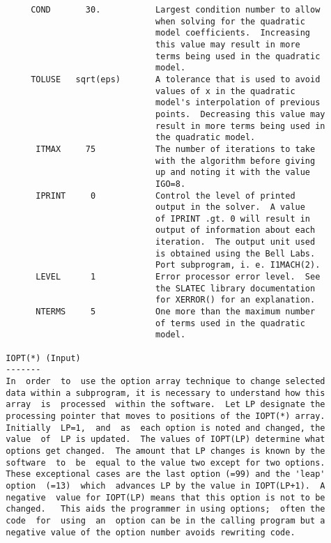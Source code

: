 \begin{verbatim}
       COND       30.           Largest condition number to allow
                                when solving for the quadratic
                                model coefficients.  Increasing
                                this value may result in more
                                terms being used in the quadratic
                                model.
       TOLUSE   sqrt(eps)       A tolerance that is used to avoid
                                values of x in the quadratic
                                model's interpolation of previous
                                points.  Decreasing this value may
                                result in more terms being used in
                                the quadratic model.
        ITMAX     75            The number of iterations to take
                                with the algorithm before giving
                                up and noting it with the value
                                IGO=8.
        IPRINT     0            Control the level of printed
                                output in the solver.  A value
                                of IPRINT .gt. 0 will result in
                                output of information about each
                                iteration.  The output unit used
                                is obtained using the Bell Labs.
                                Port subprogram, i. e. I1MACH(2).
        LEVEL      1            Error processor error level.  See
                                the SLATEC library documentation
                                for XERROR() for an explanation.
        NTERMS     5            One more than the maximum number
                                of terms used in the quadratic
                                model.

  IOPT(*) (Input)
  -------
  In  order  to  use the option array technique to change selected
  data within a subprogram, it is necessary to understand how this
  array  is  processed  within the software.  Let LP designate the
  processing pointer that moves to positions of the IOPT(*) array.
  Initially  LP=1,  and  as  each option is noted and changed, the
  value  of  LP is updated.  The values of IOPT(LP) determine what
  options get changed.  The amount that LP changes is known by the
  software  to  be  equal to the value two except for two options.
  These exceptional cases are the last option (=99) and the 'leap'
  option  (=13)  which  advances LP by the value in IOPT(LP+1).  A
  negative  value for IOPT(LP) means that this option is not to be
  changed.   This aids the programmer in using options;  often the
  code  for  using  an  option can be in the calling program but a
  negative value of the option number avoids rewriting code.


\end{verbatim}
